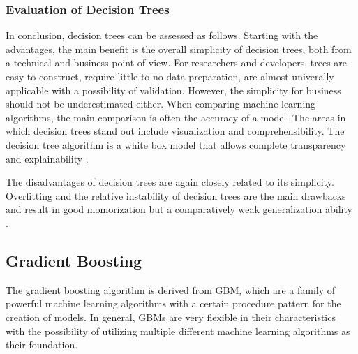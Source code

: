 %

\subsubsection{Evaluation of Decision Trees}

In conclusion, decision trees can be assessed as follows. Starting with the advantages,
the main benefit is the overall simplicity of decision trees, both from a technical and 
business point of view. For researchers and developers, trees are easy to construct, require little
to no data preparation, are almost univerally applicable with a possibility of validation. 
However, the simplicity for business should not be underestimated either. When comparing machine
learning algorithms, the main comparison is often the accuracy of a model. The areas in which 
decision trees stand out include visualization and comprehensibility. The decision tree algorithm 
is a white box model that allows complete transparency and explainability \cite[p.339]{James2021} \cite[10.10.]{sklearn Decision Trees}. 

The disadvantages of decision trees are again closely related to its simplicity. Overfitting and 
the relative instability of decision trees are the main drawbacks and result in good momorization 
but a comparatively weak generalization ability \cite[p.339]{James2021} \cite[10.10.]{sklearn Decision Trees}.

\subsection{Gradient Boosting}

The gradient boosting algorithm is derived from \ac{GBM}, which are a family of 
powerful machine learning algorithms with a certain procedure pattern for the creation of models. 
In general, \ac{GBM}s are very flexible in their characteristics with the possibility of utilizing 
multiple different machine learning algorithms as their foundation.

